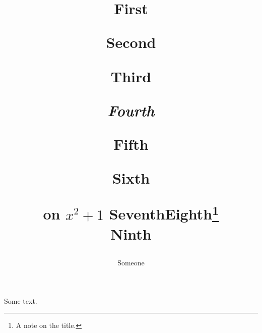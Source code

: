 \documentclass{article}
\title{

First\par Second {\Large\bfseries Third\par} {\itshape Fourth\par}
  {\sffamily Fifth\par} {\ttfamily Sixth\par} on $x^2+1$\br
  Seventh\endgraf Eighth\thanks{A note on the title.}\\[1ex] Ninth}
\author{Someone}
\begin{document}
\maketitle
Some text.
\end{document}
